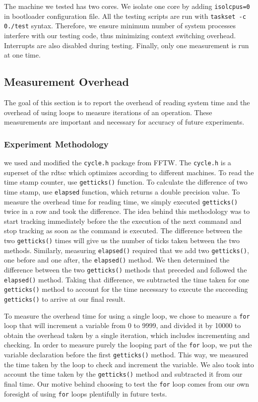 \documentclass{article} %
\begin{document}
The machine we tested has two cores. We isolate one core by adding
\texttt{isolcpus=0} in bootloader configuration file. All the testing scripts
are run with \texttt{taskset -c 0\space./test} syntax. Therefore, we ensure minimum
number of system processes interfere with our testing code, thus minimizing
context switching overhead. Interrupts are also disabled during testing.
Finally, only one measurement is run at one time.

\subsection{Measurement Overhead}
The goal of this section is to report the overhead of reading system time and
the overhead of using loops to measure iterations of an operation.  These
measurements are important and necessary for accuracy of future experiments.

\subsubsection{Experiment Methodology}
we used and modified the \texttt{cycle.h} package from FFTW\cite{FFTW}.  The
\texttt{cycle.h} is a superset of the rdtsc which optimizes according to
different machines.  To read the time stamp counter, use \texttt{getticks()}
function. To calculate the difference of two time stamp, use \texttt{elapsed}
function, which returns a double precision value.  To measure the overhead
time for reading time, we simply executed \texttt{getticks()} twice in a row
and took the difference. The idea behind this methodology was to start
tracking immediately before the the execution of the next command and stop
tracking as soon as the command is executed. The difference between the two
\texttt{getticks()} times will give us the number of ticks taken between the
two methods. Similarly, measuring \texttt{elapsed()} required that we add two
\texttt{getticks()}, one before and one after, the \texttt{elapsed()} method.
We then determined the difference between the two \texttt{getticks()} methods
that preceded and followed the \texttt{elapsed()} method. Taking that
difference, we subtracted the time taken for one \texttt{getticks()} method to
account for the time necessary to execute the succeeding \texttt{getticks()}
to arrive at our final result.

To measure the overhead time for using a single loop, we chose to measure
a \texttt{for} loop that will increment a variable from 0 to 9999, and
divided it by 10000 to obtain the overhead taken by a single iteration, which
includes incrementing and checking. In order to measure purely the looping
part of the \texttt{for} loop, we put the variable declaration before the
first \texttt{getticks()} method. This way, we measured the time taken by the
loop to check and increment the variable. We also took into account the time
taken by the \texttt{getticks()} method and subtracted it from our final time.
Our motive behind choosing to test the \texttt{for} loop comes from our own foresight
of using \texttt{for} loops plentifully in future tests.
\end{document}
